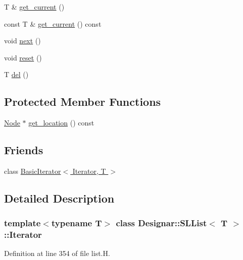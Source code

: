 \begin{DoxyCompactItemize}
T \& \hyperlink{class_designar_1_1_s_l_list_1_1_iterator_a4986f4352424c32e5518ce1435474f0b}{get\+\_\+current} ()
\item 
const T \& \hyperlink{class_designar_1_1_s_l_list_1_1_iterator_aa29dad95637eeaf662bcc3a8bb02d77a}{get\+\_\+current} () const
\item 
void \hyperlink{class_designar_1_1_s_l_list_1_1_iterator_a37eb6d2f01ce3e41785512742cab0fbc}{next} ()
\item 
void \hyperlink{class_designar_1_1_s_l_list_1_1_iterator_adb490da387d9628b7b61217247e96d97}{reset} ()
\item 
T \hyperlink{class_designar_1_1_s_l_list_1_1_iterator_ae9fc8898009213695804526b4fe8c2cb}{del} ()
\end{DoxyCompactItemize}
\subsection*{Protected Member Functions}
\begin{DoxyCompactItemize}
\item 
\hyperlink{class_designar_1_1_node_s_l_list_a41963019ada1025099e3259207a3de96}{Node} $\ast$ \hyperlink{class_designar_1_1_s_l_list_1_1_iterator_af994c3d4b1f178e55d8b68d3b7a515cf}{get\+\_\+location} () const
\end{DoxyCompactItemize}
\subsection*{Friends}
\begin{DoxyCompactItemize}
\item 
class \hyperlink{class_designar_1_1_s_l_list_1_1_iterator_ae3421d6be56b523bf3c41ceb29f3e5d7}{Basic\+Iterator$<$ Iterator, T $>$}
\end{DoxyCompactItemize}


\subsection{Detailed Description}
\subsubsection*{template$<$typename T$>$\newline
class Designar\+::\+S\+L\+List$<$ T $>$\+::\+Iterator}



Definition at line 354 of file list.\+H.



